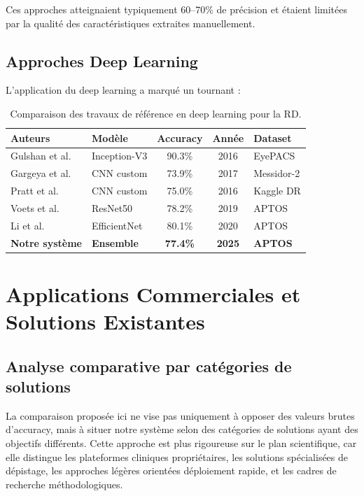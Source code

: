 \documentclass[12pt,a4paper,oneside]{report}
\begin{document}
Ces approches atteignaient typiquement 60--70\% de précision et étaient
limitées par la qualité des caractéristiques extraites manuellement.

\subsection{Approches Deep Learning}

L'application du deep learning a marqué un tournant :

\begin{table}[H]
\centering
\caption{Comparaison des travaux de référence en deep learning pour la RD.}
\label{tab:etat_art}
\begin{tabular}{|l|l|c|c|l|}
\hline
\textbf{Auteurs} & \textbf{Modèle} & \textbf{Accuracy} & \textbf{Année} & \textbf{Dataset} \\
\hline
Gulshan et al. & Inception-V3 & 90.3\% & 2016 & EyePACS \\
Gargeya et al. & CNN custom & 73.9\% & 2017 & Messidor-2 \\
Pratt et al. & CNN custom & 75.0\% & 2016 & Kaggle DR \\
Voets et al. & ResNet50 & 78.2\% & 2019 & APTOS \\
Li et al. & EfficientNet & 80.1\% & 2020 & APTOS \\
\textbf{Notre système} & \textbf{Ensemble} & \textbf{77.4\%} & \textbf{2025} & \textbf{APTOS} \\
\hline
\end{tabular}
\end{table}

\section{Applications Commerciales et Solutions Existantes}

\subsection{Analyse comparative par catégories de solutions}

La comparaison proposée ici ne vise pas uniquement à opposer des valeurs
brutes d'accuracy, mais à situer notre système selon des catégories de
solutions ayant des objectifs différents. Cette approche est plus rigoureuse
sur le plan scientifique, car elle distingue les plateformes cliniques
propriétaires, les solutions spécialisées de dépistage, les approches légères
orientées déploiement rapide, et les cadres de recherche méthodologiques.
\end{document}
